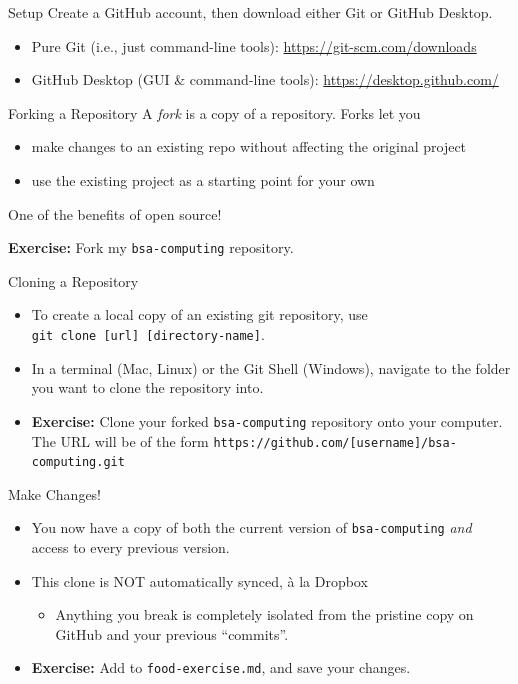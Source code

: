 \documentclass{beamer}\usepackage[]{graphicx}\usepackage[]{color}
\begin{document}
	\begin{frame}{Setup}
		Create a GitHub account, then download either Git or GitHub Desktop.
		\begin{itemize}
			\item Pure Git (i.e., just command-line tools): \url{https://git-scm.com/downloads}
			\item GitHub Desktop (GUI \& command-line tools): \url{https://desktop.github.com/}
		\end{itemize}
	\end{frame}
	
	\begin{frame}{Forking a Repository}
		A \textit{fork} is a copy of a repository. Forks let you
		\begin{itemize}
			\item make changes to an existing repo without affecting the original project
			\item use the existing project as a starting point for your own
		\end{itemize}
		One of the benefits of open source!
		
		\textbf{Exercise:} Fork my \texttt{bsa-computing} repository.
	\end{frame}
	
	\begin{frame}{Cloning a Repository}
		\begin{itemize}
			\item To create a local copy of an existing git repository, use 
			\\ \texttt{git clone [url] [directory-name]}.
			\item In a terminal (Mac, Linux) or the Git Shell (Windows), navigate to the folder you want to clone the repository into.
			\item \textbf{Exercise:} Clone your forked \texttt{bsa-computing} repository onto your computer. The URL will be of the form \texttt{https://github.com/[username]/bsa-computing.git}
		\end{itemize}
	\end{frame}
	
	\begin{frame}{Make Changes!}
		\begin{itemize}
			\item You now have a copy of both the current version of \texttt{bsa-computing} \textit{and} access to every previous version.
			\item This clone is NOT automatically synced, \`a la Dropbox
			\begin{itemize}
				\item Anything you break is completely isolated from the pristine copy on GitHub and your previous ``commits''.
			\end{itemize}
			\item \textbf{Exercise:} Add to \texttt{food-exercise.md}, and save your changes.
		\end{itemize}
	\end{frame}
	
\end{document}

